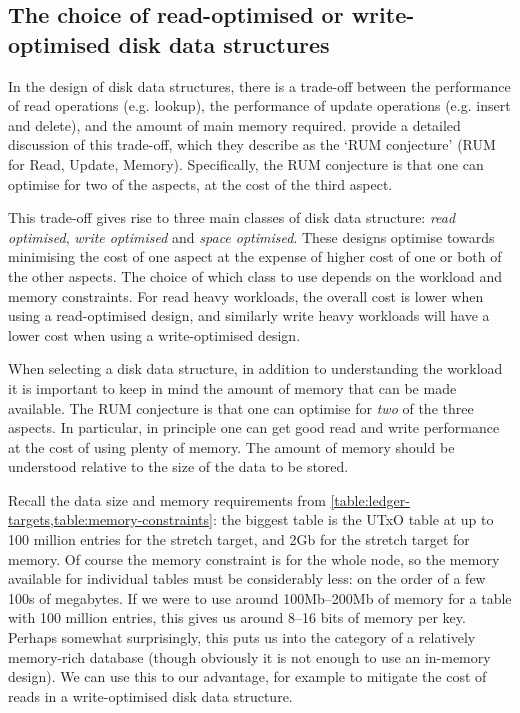 \documentclass[11pt,a4paper]{article}
\begin{document}
\subsection{The choice of read-optimised or write-optimised disk data structures}
\label{sec:read-vs-write-optimised}

In the design of disk data structures, there is a trade-off between the
performance of read operations (e.g. {\sc lookup}), the performance of update
operations (e.g. {\sc insert} and {\sc delete}), and the amount of main memory
required. \cite{rum-conjecture} provide a detailed discussion of this trade-off,
which they describe as the `RUM conjecture' (RUM for Read, Update, Memory).
Specifically, the RUM conjecture is that one can optimise for two of the
aspects, at the cost of the third aspect.

This trade-off gives rise to three main classes of disk data structure:
\emph{read optimised}, \emph{write optimised} and \emph{space optimised}. These
designs optimise towards minimising the cost of one aspect at the expense of
higher cost of one or both of the other aspects. The choice of which class to
use depends on the workload and memory constraints. For read heavy workloads,
the overall cost is lower when using a read-optimised design, and similarly
write heavy workloads will have a lower cost when using a write-optimised
design.

When selecting a disk data structure, in addition to understanding the workload
it is important to keep in mind the amount of memory that can be made available.
The RUM conjecture is that one can optimise for \emph{two} of the three aspects.
In particular, in principle one can get good read and write performance at the
cost of using plenty of memory. The amount of memory should be understood
relative to the size of the data to be stored.

Recall the data size and memory requirements from
\cref{table:ledger-targets,table:memory-constraints}: the biggest table is the
UTxO table at up to 100 million entries for the stretch target, and 2Gb for the
stretch target for memory. Of course the memory constraint is for the whole
node, so the memory available for individual tables must be considerably less:
on the order of a few 100s of megabytes. If we were to use around 100Mb--200Mb
of memory for a table with 100 million entries, this gives us around 8--16 bits
of memory per key. Perhaps somewhat surprisingly, this puts us into the
category of a relatively memory-rich database (though obviously it is not
enough to use an in-memory design). We can use this to our advantage, for
example to mitigate the cost of reads in a write-optimised disk data structure.
\end{document}
